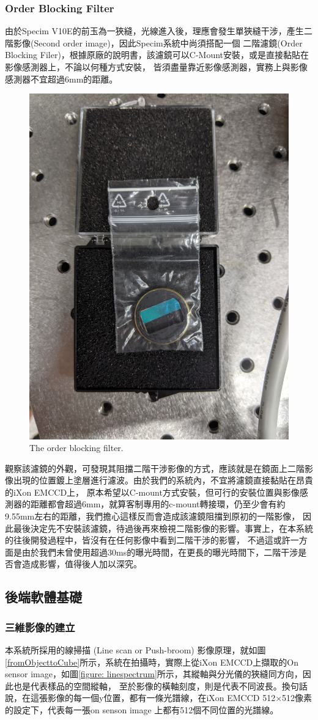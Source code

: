 \documentclass[12pt]{article}
\begin{document}
\subsubsection{Order Blocking Filter}
由於Specim V10E的前玉為一狹縫，光線進入後，理應會發生單狹縫干涉，產生二階影像(Second order image)，因此Specim系統中尚須搭配一個
二階濾鏡(Order Blocking Filer)，根據原廠的說明書，該濾鏡可以C-Mount安裝，或是直接黏貼在影像感測器上，不論以何種方式安裝，
皆須盡量靠近影像感測器，實務上與影像感測器不宜超過6mm的距離\cite{manual}。
\begin{figure}[t]
    \centering
    \includegraphics[width=0.5\linewidth]{PXL_20210723_094341395.jpg}
    \caption{The order blocking filter.}
    \label{figure: obf}
\end{figure}
觀察該濾鏡的外觀，可發現其阻擋二階干涉影像的方式，應該就是在鏡面上二階影像出現的位置鍍上塗層進行濾波。由於我們的系統內，不宜將濾鏡直接黏貼在昂貴的iXon EMCCD上，
原本希望以C-mount方式安裝，但可行的安裝位置與影像感測器的距離都會超過6mm，就算客制專用的c-mount轉接環，仍至少會有約9.55mm左右的距離，我們擔心這樣反而會造成該濾鏡阻擋到原初的一階影像，
因此最後決定先不安裝該濾鏡，待過後再來檢視二階影像的影響。事實上，在本系統的往後開發過程中，皆沒有在任何影像中看到二階干涉的影響，
不過這或許一方面是由於我們未曾使用超過30ms的曝光時間，在更長的曝光時間下，二階干涉是否會造成影響，值得後人加以深究。

\subsection{後端軟體基礎}
\subsubsection{三維影像的建立}
本系統所採用的線掃描 (Line scan or Push-broom) 影像原理，就如圖\ref{fromObjecttoCube}所示，系統在拍攝時，實際上從iXon EMCCD上擷取的On sensor image，如圖\ref{figure: linespectrum}所示，其縱軸與分光儀的狹縫同方向，因此也是代表樣品的空間縱軸，
至於影像的橫軸刻度，則是代表不同波長。換句話說，在這張影像的每一個y位置，都有一條光譜線，在iXon EMCCD 512$\times$512像素的設定下，代表每一張on senson image
上都有512個不同位置的光譜線。
\end{document}
